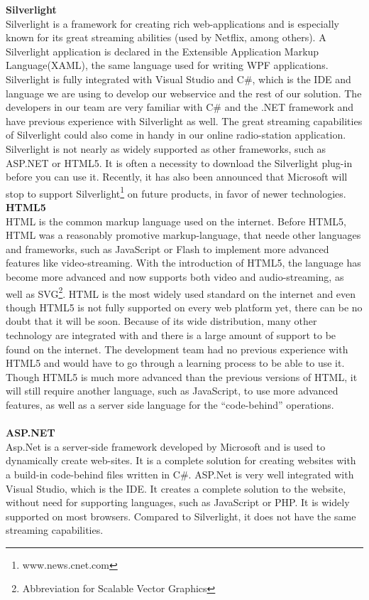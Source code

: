 \documentclass[a4paper,11pt,report]{article}
\begin{document}
\textbf{Silverlight} \\
Silverlight is a framework for creating rich web-applications and is especially known for its great streaming abilities (used by Netflix\cite{netflix}, among others). A Silverlight application is declared in the Extensible Application Markup Language(XAML), the same language used for writing WPF applications.  Silverlight is fully integrated with Visual Studio and C\#, which is the IDE and language we are using to develop our webservice and the rest of our solution. The developers in our team are very familiar with C\# and the .NET framework and have previous experience with Silverlight as well. The great streaming capabilities of Silverlight could also come in handy in our online radio-station application. Silverlight is not nearly as widely supported as other frameworks, such as ASP.NET or HTML5. It is often a necessity to download the Silverlight plug-in before you can use it. Recently, it has also been announced that Microsoft will stop to support Silverlight\footnote{www.news.cnet.com} on future products, in favor of newer technologies. \\ 

\textbf{HTML5} \\
HTML is the common markup language used on the internet. Before HTML5, HTML was a reasonably promotive markup-language, that neede other languages and frameworks, such as JavaScript or Flash to implement more advanced features like video-streaming. With the introduction of HTML5, the language has become more advanced and now supports both video and audio-streaming, as well as SVG\footnote{Abbreviation for Scalable Vector Graphics}. HTML is the most widely used standard on the internet and even though HTML5 is not fully supported on every web platform yet, there can be no doubt that it will be soon. Because of its wide distribution, many other technology are integrated with and there is a large amount of support to be found on the internet. The development team had no previous experience with HTML5 and would have to go through a learning process to be able to use it. Though HTML5 is much more advanced than the previous versions of HTML, it will still require another language, such as JavaScript, to use more advanced features, as well as a server side language for the “code-behind” operations. \\ \\

\textbf{ASP.NET} \\
Asp.Net is a server-side framework developed by Microsoft and is used to dynamically create web-sites. It is a complete solution for creating websites with a build-in code-behind files written in C\#. ASP.Net is very well integrated with Visual Studio, which is the IDE. It creates a complete solution to the website, without need for supporting languages, such as JavaScript or PHP. It is widely supported on most browsers. Compared to Silverlight, it does not have the same streaming capabilities. \\
\end{document}
